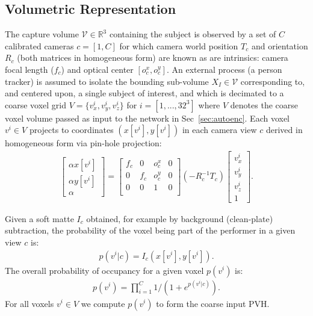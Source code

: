\documentclass[runningheads]{llncs}
\begin{document}
\subsection {Volumetric Representation}
\label{sec:pvh}
The capture volume $\mathcal{V} \in \mathbb{R}^3$ containing the subject is observed by a set of $C$ calibrated cameras $c=\left[ 1,C \right]$ for which camera world position $T_c$ and orientation $R_c$ (both matrices in homogeneous form) are known as are intrinsics: camera focal length ($f_c$) and optical center $[o^x_c,o^y_c]$. An external process (\eg a person tracker) is assumed to isolate the bounding sub-volume $X_I \in \mathcal{V}$  corresponding to, and centered upon, a single subject of interest, and which is decimated to a coarse voxel grid $V=\{v_x^i, v_y^i, v_z^i\}$ for $i=[1,...,32^3]$ where $V$ denotes the coarse voxel volume passed as input to the network in Sec~\ref{sec:autoenc}. Each voxel $v^i \in V$ projects to coordinates $(x[v^i],y[v^i])$ in each camera view $c$ derived in homogeneous form via pin-hole projection:
\begin{eqnarray}
\left[\begin{array}{c}
\alpha x[v^i]\\
\alpha y[v^i]\\
\alpha
\end{array}\right]=
\left[\begin{array}{cccc}
f_c & 0 & o^x_c & 0 \\
0 & f_c & o^y_c & 0\\
0 & 0 & 1 &0 \\
\end{array}\right]
\left(-R_c^{-1}T_c\right)
\left[\begin{array}{c}
v_x^i\\
v_y^i\\
v_z^i\\ 
1
\end{array}\right].
\end{eqnarray}

Given a soft matte $I_c$ obtained, for example by background (clean-plate) subtraction, the probability of the voxel being part of the performer in a given view $c$ is: 
\begin{eqnarray}
p(v^i | c) = I_c(x[v^i],y[v^i]).  \label{eq:pvh1}
\end{eqnarray}
The overall probability of occupancy for a given voxel $p(v^i)$ is:
\begin{eqnarray}
p(v^i) = \prod_{i=1}^C 1/(1+e^{p(v^i|c)}). \label{eq:pvh4}
\end{eqnarray}
For all voxels $v^i \in V$ we compute $p(v^i)$ to form the coarse input PVH.
\end{document}
